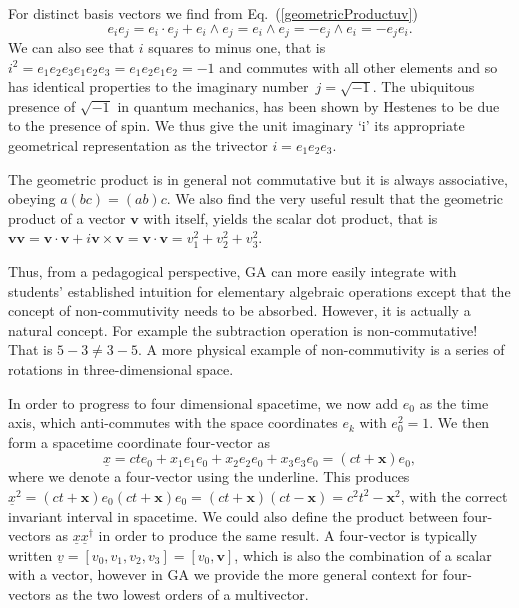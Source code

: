 \documentclass[12pt,aps,prb,preprint]{revtex4}   %
\newcommand{\be}{\begin{equation}}
\newcommand{\ee}{\end{equation}}
\newcommand{\iGA}{{i}}
\newcommand{\jGA}{{j}}
\begin{document}
For distinct basis vectors we find from Eq.~(\ref{geometricProductuv})
\begin{equation}
e_{i}e_{j}=e_{i} \cdot e_{j}+e_{i}\wedge e_{j}=e_{i}\wedge e_{j}=-e_{j}\wedge e_{i}=-e_{j}e_{i}.
\end{equation}%
We can also see that $ \iGA $ squares to minus one, that is $ \iGA^2 = e_{1}e_{2}e_{3} e_{1}e_{2}e_{3} = e_{1}e_{2} e_{1}e_{2} = -1 $
and commutes with all other elements and so has identical properties to the imaginary number~$ \jGA = \sqrt{-1} $. The ubiquitous presence of $ \sqrt{-1} $ in quantum mechanics, has been shown by Hestenes \cite{GA2} to be due to the presence of spin.  We thus give the unit imaginary `i' its appropriate geometrical representation as the trivector $ i = e_1 e_2 e_3 $.

The geometric product is in general not commutative but it is always associative, obeying $	a(bc) = (ab)c $.  
We also find the very useful result that the geometric product of a vector $ \textbf{v} $ with itself, yields the scalar dot product, that is $ \mathbf{v} \mathbf{v} = \mathbf{v} \cdot \mathbf{v} + \iGA \mathbf{v} \times \mathbf{v} = \mathbf{v} \cdot \mathbf{v}  = v_1^2 + v_2^2 + v_3^2 $.

Thus, from a pedagogical perspective, GA can more easily integrate with students' established intuition for elementary algebraic operations except that the concept of non-commutivity needs to be absorbed. However, it is actually a natural concept.  For example the subtraction operation is non-commutative!  That is $ 5-3 \ne 3 - 5 $.  A more physical example of non-commutivity is a series of rotations in three-dimensional space.  


In order to progress to four dimensional spacetime, we now add $ e_0 $ as the time axis, which anti-commutes with the space coordinates $ e_k $ with $ e_0^2 = 1 $.  We then form a spacetime coordinate four-vector as
\be
\underline{x} = c t e_0 + x_1 e_1 e_0 + x_2 e_2 e_0 + x_3 e_3 e_0 = (c t+ \textbf{x}) e_0,
\ee
where we denote a four-vector using the underline.
This produces $ \underline{x}^2 = (c t+ \textbf{x}) e_0 (c t+ \textbf{x}) e_0 = (c t+ \textbf{x}) (c t- \textbf{x}) = c^2 t^2 - \textbf{x}^2 $, with the correct invariant interval in spacetime.  We could also define the product between four-vectors as $ \underline{x} \underline{x}^{\dagger} $ in order to produce the same result. A four-vector is typically written $ \underline{v} = [ v_0,v_1,v_2,v_3] = [ v_0,\textbf{v}] $, which is also the combination of a scalar with a vector, however in GA we provide the more general context for four-vectors as the two lowest orders of a multivector.  	
\end{document}
